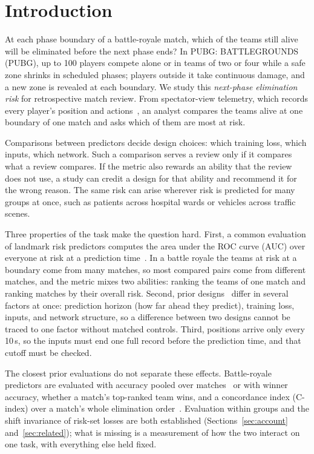 \documentclass[sigconf,anonymous]{acmart}
\begin{document}
\section{Introduction}
\label{sec:introduction}
At each phase boundary of a battle-royale match, which of the teams still alive will be eliminated before the next phase ends? In PUBG: BATTLEGROUNDS (PUBG), up to 100 players compete alone or in teams of two or four while a safe zone shrinks in scheduled phases; players outside it take continuous damage, and a new zone is revealed at each boundary. We study this \emph{next-phase elimination risk} for retrospective match review. From spectator-view telemetry, which records every player's position and actions~\cite{PUBGAPI}, an analyst compares the teams alive at one boundary of one match and asks which of them are most at risk.

Comparisons between predictors decide design choices: which training loss, which inputs, which network. Such a comparison serves a review only if it compares what a review compares. If the metric also rewards an ability that the review does not use, a study can credit a design for that ability and recommend it for the wrong reason. The same risk can arise wherever risk is predicted for many groups at once, such as patients across hospital wards or vehicles across traffic scenes.

Three properties of the task make the question hard. First, a common evaluation of landmark risk predictors computes the area under the ROC curve (AUC) over everyone at risk at a prediction time~\cite{vanHouwelingen07,HeagertyZheng05}. In a battle royale the teams at risk at a boundary come from many matches, so most compared pairs come from different matches, and the metric mixes two abilities: ranking the teams of one match and ranking matches by their overall risk. Second, prior designs~\cite{Sagong25a,KRAFTON} differ in several factors at once: prediction horizon (how far ahead they predict), training loss, inputs, and network structure, so a difference between two designs cannot be traced to one factor without matched controls. Third, positions arrive only every 10\,s, so the inputs must end one full record before the prediction time, and that cutoff must be checked.

The closest prior evaluations do not separate these effects. Battle-royale predictors are evaluated with accuracy pooled over matches~\cite{Sagong25a} or with winner accuracy, whether a match's top-ranked team wins, and a concordance index (C-index) over a match's whole elimination order~\cite{KRAFTON}. Evaluation within groups and the shift invariance of risk-set losses are both established (Sections~\ref{sec:account} and~\ref{sec:related}); what is missing is a measurement of how the two interact on one task, with everything else held fixed.
\end{document}
